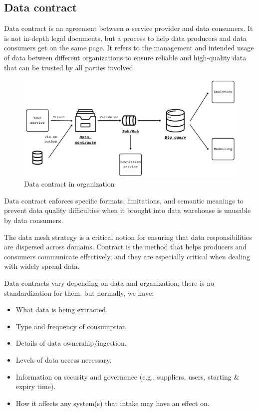\documentclass[12pt, a4paper]{book}
\begin{document}
\subsection{Data contract}
Data contract is an agreement between a service provider and data consumers. It is not in-depth legal documents, but a process to help data producers and data consumers get on the same page. It refers to the management and intended usage of data between different organizations to ensure reliable and high-quality data that can be trusted by all parties involved. \cite{contract}

\begin{figure}[ht]
	\begin{framed}
		\centering
		\includegraphics[width=13cm]{datacontract.png}
		\caption{Data contract in organization}
		\label{datacontract}
	\end{framed}
\end{figure}

Data contract enforces specific formats, limitations, and semantic meanings to prevent data quality difficulties when it brought into data warehouse is unusable by data consumers.

The data mesh strategy is a critical notion for ensuring that data responsibilities are dispersed across domains. Contract is the method that helps producers and consumers communicate effectively, and they are especially critical when dealing with widely spread data.

Data contracts vary depending on data and organization, there is no standardization for them, but normally, we have:
	\begin{itemize}[nosep]
		\item What data is being extracted.
		\item Type and frequency of consumption.
		\item Details of data ownership/ingestion.
		\item Levels of data access necessary.
		\item Information on security and governance (e.g., suppliers, users, starting \& expiry time).
		\item How it affects any system(s) that intake may have an effect on.
	\end{itemize}
\end{document}
